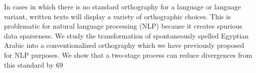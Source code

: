 In cases in which there is no standard orthography for a language or language variant, written texts will display a variety of orthographic choices. This is
 problematic for natural language processing (NLP) because it creates spurious
 data sparseness. We study the transformation of spontaneously spelled Egyptian
 Arabic into a conventionalized orthography which we have previously proposed
 for NLP purposes. We show that a two-stage process can reduce divergences from
 this standard by 69%

